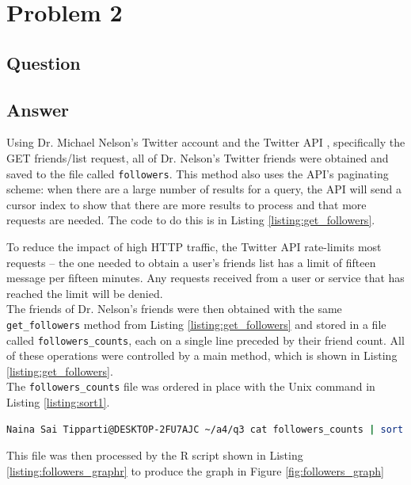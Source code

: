 \section{Problem 2}

\subsection{Question}
\vspace*{10pt}


\subsection{Answer}
Using Dr. Michael Nelson's Twitter account and the Twitter API \cite{api:twitter}, specifically the GET friends/list \cite{api:twitter_followerslist} request, all of Dr. Nelson's Twitter friends were obtained and saved to the file called {\tt followers}. This method also uses the API's paginating scheme: when there are a large number of results for a query, the API will send a cursor index to show that there are more results to process and that more requests are needed. The code to do this is in Listing \ref{listing:get_followers}. 



\clearpage
To reduce the impact of high HTTP traffic, the Twitter API rate-limits most requests -- the one needed to obtain a user's friends list has a limit of fifteen message per fifteen minutes. Any requests received from a user or service that has reached the limit will be denied.
\\
The friends of Dr. Nelson's friends were then obtained with the same {\tt get\_followers} method from Listing \ref{listing:get_followers} and stored in a file called {\tt followers\_counts}, each on a single line preceded by their friend count. All of these operations were controlled by a main method, which is shown in Listing \ref{listing:get_followers}.
\\
The {\tt followers\_counts} file was ordered in place with the Unix command in Listing \ref{listing:sort1}. 
\vspace{2mm}
\begin{lstlisting}[language=Bash,caption={Sort command},label=listing:sort1]
Naina Sai Tipparti@DESKTOP-2FU7AJC ~/a4/q3 cat followers_counts | sort -g -o followers_counts
\end{lstlisting}
\vspace{2mm}
This file was then processed by the R script shown in Listing \ref{listing:followers_graphr} to produce the graph in Figure \ref{fig:followers_graph}

